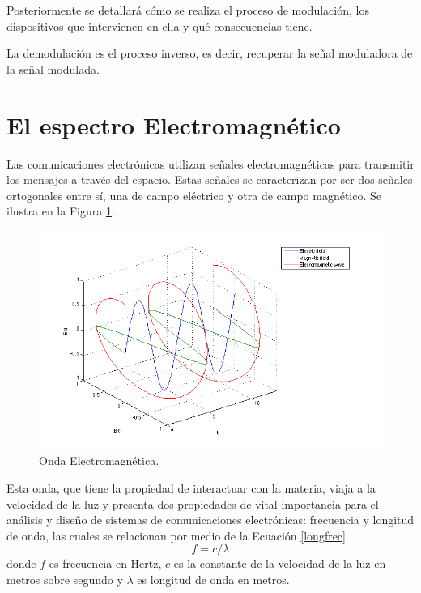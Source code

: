 \documentclass[12pt,letterpaper,titlepage,twoside]{book}
\begin{document}
Posteriormente se detallará cómo se realiza el proceso de modulación, los  dispositivos que intervienen en ella y qué consecuencias tiene.

La demodulación es el proceso inverso, es decir, recuperar la señal moduladora de la señal modulada. 




\section{El espectro Electromagnético}

Las comunicaciones electrónicas utilizan señales electromagnéticas para transmitir los mensajes a través del espacio. Estas señales se caracterizan por ser dos señales ortogonales entre sí, una de campo eléctrico y otra de campo magnético. Se ilustra en la Figura \ref{wave}.

\begin{figure}[th]
\begin{center}
\includegraphics[scale=.7]{./wave.png}\caption{Onda Electromagnética.}\label{wave}
\end{center}
\end{figure} 

Esta onda, que tiene la propiedad de interactuar con la materia, viaja a la velocidad de la luz y presenta dos propiedades de vital importancia para el análisis y diseño de sistemas de comunicaciones electrónicas: frecuencia y longitud de onda, las cuales se relacionan por medio de la Ecuación \ref{longfrec}
\begin{equation}
f = c/\lambda 
\end{equation}
donde $f$ es frecuencia en Hertz, $c$ es la constante de la velocidad de la luz en metros sobre segundo y $\lambda$ es longitud de onda en metros.
\end{document}

